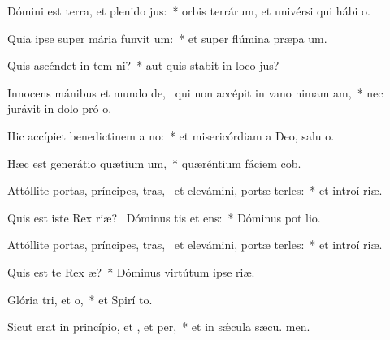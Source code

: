 \item Dómini est terra, et plenido jus:~* orbis terrárum, et univérsi qui hábi  o.
\item Quia ipse super mária funvit um:~* et super flúmina præpa um.
\item Quis ascéndet in tem ni?~* aut quis stabit in loco  jus?
\item Innocens mánibus et mundo de,~\pscross{} qui non accépit in vano nimam am,~* nec jurávit in dolo pró o.
\item Hic accípiet benedictinem a no:~* et misericórdiam a Deo, salu o.
\item Hæc est generátio quætium um,~* quæréntium fáciem  cob.
\item Attóllite portas, príncipes, tras,~\pscross{} et elevámini, portæ terles:~* et introí  riæ.
\item Quis est iste Rex riæ?~\pscross{} Dóminus tis et ens:~* Dóminus pot  lio.
\item Attóllite portas, príncipes, tras,~\pscross{} et elevámini, portæ terles:~* et introí  riæ.
\item Quis est te Rex æ?~* Dóminus virtútum ipse   riæ.
\item Glória tri, et o,~* et Spirí to.
\item Sicut erat in princípio, et , et per,~* et in sǽcula sæcu. men.
